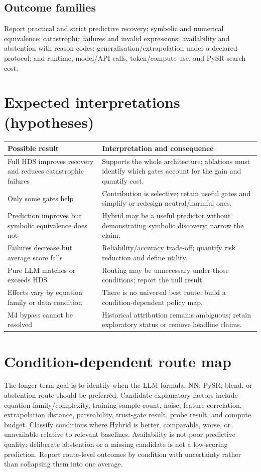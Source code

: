 \documentclass[11pt,a4paper]{article}
\begin{document}
\subsection{Outcome families}
Report practical and strict predictive recovery; symbolic and numerical equivalence; catastrophic failures and invalid expressions; availability and abstention with reason codes; generalisation/extrapolation under a declared protocol; and runtime, model/API calls, token/compute use, and PySR search cost.
\section{Expected interpretations (hypotheses)}
\begin{longtable}{p{}p{}}\toprule
\textbf{Possible result}&\textbf{Interpretation and consequence}\\\midrule
Full HDS improves recovery and reduces catastrophic failures&Supports the whole architecture; ablations must identify which gates account for the gain and quantify cost.\\
Only some gates help&Contribution is selective; retain useful gates and simplify or redesign neutral/harmful ones.\\
Prediction improves but symbolic equivalence does not&Hybrid may be a useful predictor without demonstrating symbolic discovery; narrow the claim.\\
Failures decrease but average score falls&Reliability/accuracy trade-off; quantify risk reduction and define utility.\\
Pure LLM matches or exceeds HDS&Routing may be unnecessary under those conditions; report the null result.\\
Effects vary by equation family or data condition&There is no universal best route; build a condition-dependent policy map.\\
M4 bypass cannot be resolved&Historical attribution remains ambiguous; retain exploratory status or remove headline claims.\\\bottomrule\end{longtable}
\section{Condition-dependent route map}
The longer-term goal is to identify when the LLM formula, NN, PySR, blend, or abstention route should be preferred. Candidate explanatory factors include equation family/complexity, training sample count, noise, feature correlation, extrapolation distance, parseability, trust-gate result, probe result, and compute budget. Classify conditions where Hybrid is better, comparable, worse, or unavailable relative to relevant baselines. Availability is not poor predictive quality: deliberate abstention or a missing candidate is not a low-scoring prediction. Report route-level outcomes by condition with uncertainty rather than collapsing them into one average.
\end{document}
